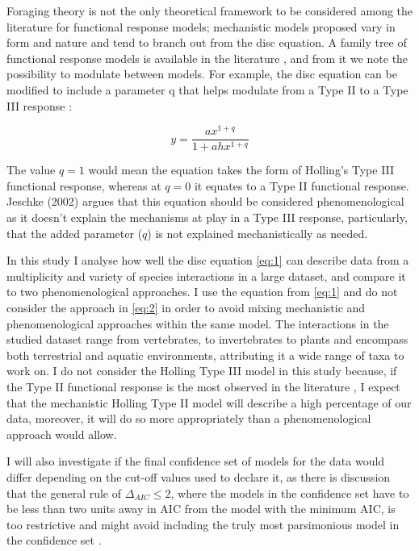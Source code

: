 \documentclass[11pt]{article}
\begin{document}
  Foraging theory is not the only theoretical framework to be considered among the literature for functional response models; mechanistic models proposed vary in form and nature and tend to branch out from the disc equation. A family tree of functional response models is available in the literature \cite{Jeschke2002}, and from it we note the possibility to modulate between models. For example, the disc equation can be modified to include a parameter q that helps modulate from a Type II to a Type III response \cite{Real1977,Real1979}:
  
  \begin{linenomath*}
    \begin{equation}
      y=\frac{ax^{1+q}}{1+ahx^{1+q}}\label{eq:2}
    \end{equation}
  \end{linenomath*}
  
  The value $q=1$ would mean the equation takes the form of Holling’s Type III functional response, whereas at $q=0$ it equates to a Type II functional response. Jeschke (2002) \cite{Jeschke2002} argues that this equation should be considered phenomenological as it doesn’t explain the mechanisms at play in a Type III response, particularly, that the added parameter ($q$) is not explained mechanistically as needed. 
  
  In this study I analyse how well the disc equation \eqref{eq:1} can describe data from a multiplicity and variety of species interactions in a large dataset, and compare it to two phenomenological approaches. I use the equation from \eqref{eq:1} and do not consider the approach in \eqref{eq:2} in order to avoid mixing mechanistic and phenomenological approaches within the same model. The interactions in the studied dataset range from vertebrates, to invertebrates to plants and encompass both terrestrial and aquatic environments, attributing it a wide range of taxa to work on. I do not consider the Holling Type III model in this study because, if the Type II functional response is the most observed in the literature \cite{Jeschke2002}, I expect that the mechanistic Holling Type II model will describe a high percentage of our data, moreover, it will do so more appropriately than a phenomenological approach would allow. 
  
  I will also investigate if the final confidence set of models for the data would differ depending on the cut-off values used to declare it, as there is discussion that the general rule of $\Delta_{AIC}\leq2$, where the models in the confidence set have to be less than two units away in AIC from the model with the minimum AIC, is too restrictive and might avoid including the truly most parsimonious model in the confidence set \cite{Richards2008, Richards2011}.
\end{document}
